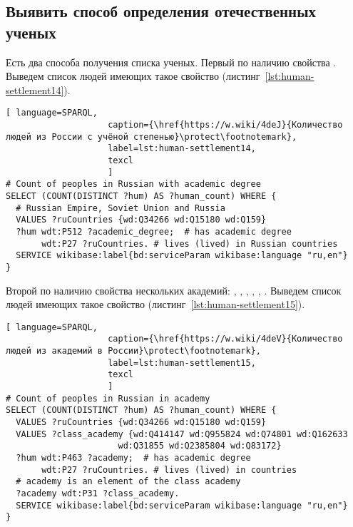 \subsection{Выявить способ определения отечественных ученых}

Есть два способа получения списка ученых. 
Первый по наличию свойства . Выведем список людей имеющих такое свойство (листинг~\protect\ref{lst:human-settlement14}). 

\begin{lstlisting}[ language=SPARQL, 
                    caption={\href{https://w.wiki/4deJ}{Количество людей из России с учёной степенью}\protect\footnotemark},
                    label=lst:human-settlement14,
                    texcl 
                    ]
# Count of peoples in Russian with academic degree
SELECT (COUNT(DISTINCT ?hum) AS ?human_count) WHERE {
  # Russian Empire, Soviet Union and Russia
  VALUES ?ruCountries {wd:Q34266 wd:Q15180 wd:Q159}
  ?hum wdt:P512 ?academic_degree;  # has academic degree 
       wdt:P27 ?ruCountries. # lives (lived) in Russian countries
  SERVICE wikibase:label{bd:serviceParam wikibase:language "ru,en"}
}
\end{lstlisting}%

Второй по наличию свойства  нескольких академий: , , , , , . Выведем список людей имеющих такое свойство (листинг~\protect\ref{lst:human-settlement15}). 

\begin{lstlisting}[ language=SPARQL, 
                    caption={\href{https://w.wiki/4deV}{Количество людей из академий в России}\protect\footnotemark},
                    label=lst:human-settlement15,
                    texcl 
                    ]
# Count of peoples in Russian in academy
SELECT (COUNT(DISTINCT ?hum) AS ?human_count) WHERE {
  VALUES ?ruCountries {wd:Q34266 wd:Q15180 wd:Q159}
  VALUES ?class_academy {wd:Q414147 wd:Q955824 wd:Q74801 wd:Q162633 
                      wd:Q31855 wd:Q2385804 wd:Q83172}
  ?hum wdt:P463 ?academy;  # has academic degree 
       wdt:P27 ?ruCountries. # lives (lived) in countries
  # academy is an element of the class academy
  ?academy wdt:P31 ?class_academy. 
  SERVICE wikibase:label{bd:serviceParam wikibase:language "ru,en"}
}
\end{lstlisting}%

